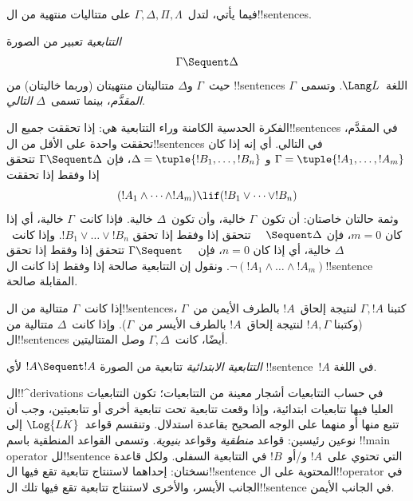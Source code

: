 \documentclass[../../../include/open-logic-section]{subfiles}
\begin{document}
      {}
      {}


فيما يأتي، لتدل~$\Gamma, \Delta, \Pi, \Lambda$ على متتاليات منتهية
من ال!!{sentence}s.

\begin{defn}[التتابعية]
\emph{التتابعية} تعبير من الصورة
\[
\Gamma \Sequent \Delta
\]
حيث~$\Gamma$ و$\Delta$ متتاليتان منتهيتان (وربما خاليتان) من
!!{sentence}s اللغة~$\Lang L$. وتسمى~$\Gamma$ \emph{المقدَّم}، بينما
تسمى~$\Delta$ \emph{التالي}.
\end{defn}

\begin{explain}
الفكرة الحدسية الكامنة وراء التتابعية هي: إذا تحققت جميع
ال!!{sentence}s في المقدَّم، تحققت واحدة على الأقل من ال!!{sentence}s في
التالي. أي إنه إذا كان $\Gamma = \tuple{!A_1, \dots, !A_m}$ و
$\Delta = \tuple{!B_1, \dots, !B_n}$، فإن $\Gamma \Sequent \Delta$
تتحقق إذا وفقط إذا تحققت
\[
(!A_1 \land \cdots \land !A_m) \lif (!B_1 \lor \cdots \lor
!B_n)
\]
وثمة حالتان خاصتان: أن تكون~$\Gamma$ خالية، وأن تكون~$\Delta$ خالية.
فإذا كانت~$\Gamma$ خالية، أي إذا كان $m = 0$، فإن $\quad
\Sequent \Delta$ تتحقق إذا وفقط إذا تحقق
$!B_1 \lor \dots \lor !B_n$. وإذا كانت~$\Delta$ خالية، أي إذا كان
$n = 0$، فإن $\Gamma \Sequent \quad$ تتحقق إذا وفقط إذا تحقق
$\lnot(!A_1 \land \dots \land !A_m)$. ونقول إن التتابعية صالحة إذا
وفقط إذا كانت ال!!{sentence} المقابلة صالحة.
\end{explain}

إذا كانت~$\Gamma$ متتالية من ال!!{sentence}s، كتبنا $\Gamma, !A$
لنتيجة إلحاق~$!A$ بالطرف الأيمن من~$\Gamma$ (وكتبنا $!A, \Gamma$
لنتيجة إلحاق~$!A$ بالطرف الأيسر من~$\Gamma$). وإذا كانت~$\Delta$
متتالية من ال!!{sentence}s أيضًا، كانت~$\Gamma, \Delta$ وصل
المتتاليتين.

\begin{defn}
\emph{التتابعية الابتدائية} تتابعية
{من الصورة $!A \Sequent !A$} لأي !!{sentence}~$!A$ في اللغة.
\end{defn}

ال!!^{derivation}s في حساب التتابعيات أشجار معينة من التتابعيات؛ تكون
التتابعيات العليا فيها تتابعيات ابتدائية، وإذا وقعت تتابعية تحت
تتابعية أخرى أو تتابعيتين، وجب أن تتبع منها أو منهما على الوجه الصحيح
بقاعدة استدلال. وتنقسم قواعد~$\Log{LK}$ إلى نوعين رئيسين: قواعد
\emph{منطقية} وقواعد \emph{بنيوية}. وتسمى القواعد المنطقية باسم
!!{main operator} لل!!{sentence} التي تحتوي على~$!A$ و/أو~$!B$ في
التتابعية السفلى. ولكل قاعدة نسختان: إحداهما لاستنتاج تتابعية تقع فيها
ال!!{sentence} المحتوية على ال!!{operator} في الجانب الأيسر، والأخرى
لاستنتاج تتابعية تقع فيها تلك ال!!{sentence} في الجانب الأيمن.
\end{document}
